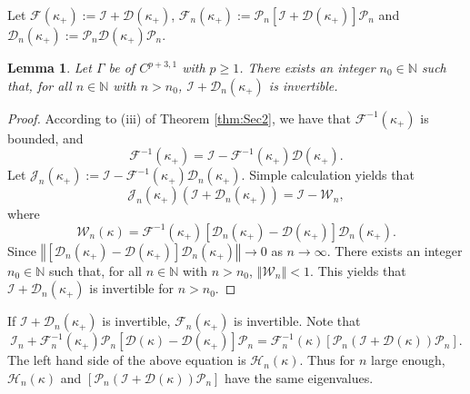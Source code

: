 \documentclass{article}
\newtheorem{lemma}{Lemma}[section]
\newcommand{\norm}[1]{\left\Vert#1\right\Vert}
\begin{document}
	
	Let $\mathcal{F}(\kappa_+):=\mathcal{I}+\mathcal{D}(\kappa_+)$, $\mathcal{F}_n(\kappa_+):=\mathcal{P}_n[\mathcal{I}+\mathcal{D}(\kappa_+)]\mathcal{P}_n$ and $\mathcal{D}_n(\kappa_+):=\mathcal{P}_n\mathcal{D}(\kappa_+)\mathcal{P}_n$.
	\begin{lemma}\label{sec3:lem4}
	Let $\Gamma$ be of $C^{p+3,1}$ with $p\geq 1$. There exists an integer $n_0\in\mathbb{N}$ such that, for all $n\in\mathbb{N}$ with $n>n_0$, $\mathcal{I}+\mathcal{D}_n(\kappa_+)$ is invertible.
	\end{lemma}
	\begin{proof}
		According to (iii) of Theorem \ref{thm:Sec2}, we have that $\mathcal{F}^{-1}(\kappa_+)$ is bounded, and 
		\begin{equation*}
		\mathcal{F}^{-1}(\kappa_+)=\mathcal{I}-\mathcal{F}^{-1}(\kappa_+)\mathcal{D}(\kappa_+). 
		\end{equation*}
	 Let $\mathcal{J}_n(\kappa_+):=\mathcal{I}-\mathcal{F}^{-1}(\kappa_+)\mathcal{D}_n(\kappa_+)$.
    Simple calculation yields that 
	 \begin{equation}
	 	\mathcal{J}_n(\kappa_+)(\mathcal{I}+\mathcal{D}_n(\kappa_+))=\mathcal{I}-\mathcal{W}_n,
	 \end{equation}
 where
 \begin{equation*}
 	\mathcal{W}_n(\kappa)=\mathcal{F}^{-1}(\kappa_+)[\mathcal{D}_n(\kappa_+)-\mathcal{D}(\kappa_+)]\mathcal{D}_n(\kappa_+).
 \end{equation*}
Since $\norm{[\mathcal{D}_n(\kappa_+)-\mathcal{D}(\kappa_+)]\mathcal{D}_n(\kappa_+)}\to 0$ as $n\to \infty$. There exists an integer $n_0\in\mathbb{N}$ such that, for all $n\in\mathbb{N}$ with $n>n_0$, $\norm{\mathcal{W}_n}<1$. This yields that
$\mathcal{I}+\mathcal{D}_n(\kappa_+)$ is invertible for $n > n_0$.
	\end{proof}
	
	If $\mathcal{I}+\mathcal{D}_n(\kappa_+)$ is invertible, $\mathcal{F}_n(\kappa_+)$ is invertible. Note that
	\begin{equation}\label{eigsRelationship}
		\mathcal{I}_n+\mathcal{F}_n^{-1}(\kappa_+)\mathcal{P}_n[\mathcal{D}(\kappa)-\mathcal{D}(\kappa_+)]\mathcal{P}_n=\mathcal{F}_n^{-1}(\kappa)[\mathcal{P}_n(\mathcal{I}+\mathcal{D}(\kappa))\mathcal{P}_n].
	\end{equation}
	The left hand side of the above equation is $\mathcal{H}_{n}(\kappa)$. Thus for $n$ large enough, $\mathcal{H}_{n}(\kappa)$ and $[\mathcal{P}_n(\mathcal{I}+\mathcal{D}(\kappa))\mathcal{P}_n]$ have the same eigenvalues.
	
\end{document}
